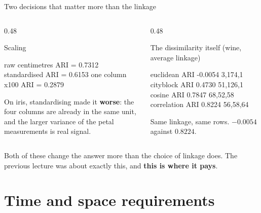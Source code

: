\documentclass[aspectratio=169]{beamer}
\begin{document}
\begin{frame}[fragile,shrink=5]{Two decisions that matter more than the linkage}
  \begin{columns}[T]
    \begin{column}{0.48\textwidth}
      \begin{block}{Scaling}
\begin{outblk}
  raw centimetres     ARI = 0.7312
  standardised        ARI = 0.6153
  one column x100     ARI = 0.2879
\end{outblk}
        \small On iris, standardising made it \textbf{worse}: the four columns
        are already in the same unit, and the larger variance of the petal
        measurements is real signal.
      \end{block}
    \end{column}
    \begin{column}{0.48\textwidth}
      \begin{block}{The dissimilarity itself (wine, average linkage)}
\begin{outblk}
  euclidean     ARI -0.0054   3,174,1
  cityblock     ARI  0.4730  51,126,1
  cosine        ARI  0.7847  68,52,58
  correlation   ARI  0.8224  56,58,64
\end{outblk}
        \small Same linkage, same rows. $-0.0054$ against $0.8224$.
      \end{block}
    \end{column}
  \end{columns}
  \vspace{0.3em}
  \begin{alertblock}{}
    \centering
    Both of these change the answer more than the choice of linkage does. The
    previous lecture was about exactly this, and \textbf{this is where it
    pays}.
  \end{alertblock}
\end{frame}

\section[Time and space]{Time and space requirements}
\label{sec:cost}
\end{document}
